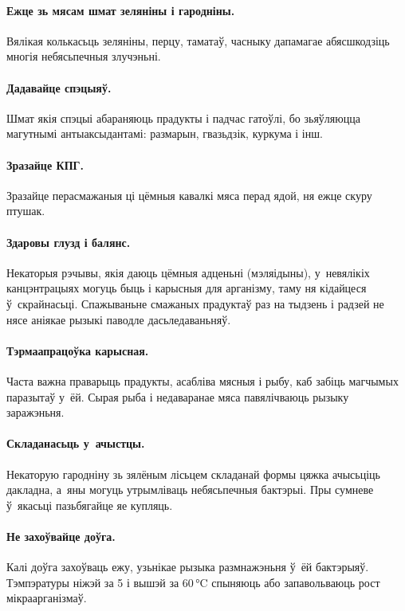 \paragraph{Ежце зь мясам шмат зеляніны і гародніны.}
Вялікая колькасьць зеляніны, перцу, таматаў, часныку дапамагае абясшкодзіць многія небясьпечныя злучэньні.


\paragraph{Дадавайце спэцыяў.}
Шмат якія спэцыі абараняюць прадукты і падчас гатоўлі, бо зьяўляюцца магутнымі антыаксыдантамі: размарын, гвазьдзік, куркума і інш.

\paragraph{Зразайце КПГ.}
Зразайце перасмажаныя ці цёмныя кавалкі мяса перад ядой, ня ежце скуру птушак.

\paragraph{Здаровы глузд і балянс.}
Некаторыя рэчывы, якія даюць цёмныя адценьні (мэляідыны), у~невялікіх канцэнтрацыях могуць быць і карысныя для арганізму, таму ня кідайцеся ў~скрайнасьці. Спажываньне смажаных прадуктаў раз на тыдзень і радзей не нясе аніякае рызыкі паводле дасьледаваньняў.

\paragraph{Тэрмаапрацоўка карысная.}
Часта важна праварыць прадукты, асабліва мясныя і рыбу, каб забіць магчымых паразытаў у~ёй. Сырая рыба і недаваранае мяса павялічваюць рызыку заражэньня.

\paragraph{Складанасьць у~ачыстцы.}
Некаторую гародніну зь зялёным лісьцем складанай формы цяжка ачысьціць дакладна, а~яны могуць утрымліваць небясьпечныя бактэрыі. Пры сумневе ў~якасьці пазьбягайце яе купляць.

\paragraph{Не захоўвайце доўга.}
Калі доўга захоўваць ежу, узьнікае рызыка размнажэньня ў~ёй бактэрыяў. Тэмпэратуры ніжэй за 5 і вышэй за 60\,°C спыняюць або запавольваюць рост мікраарганізмаў.


